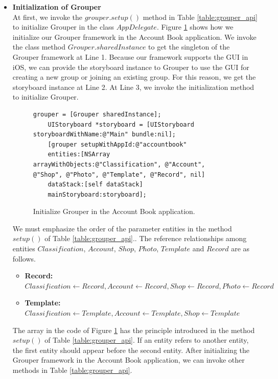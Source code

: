 \documentclass[a4paper,11pt]{report}
\begin{document}
\begin{itemize}
\setlength{\itemsep}{1pt}
\setlength{\parskip}{0pt}
\setlength{\parsep}{0pt}
\item \textbf{Initialization of Grouper} \\
At first, we invoke the $grouper.setup()$ method in Table \ref{table:grouper_api} to initialize Grouper in the class $AppDelegate$.
Figure \ref{fig:initialize_grouper} shows how we initialize our Grouper framework in the Account Book application.
We invoke the class method $Grouper.sharedInstance$ to get the singleton of the Grouper framework at Line 1.
Because our framework supports the GUI in iOS, we can provide the storyboard instance to Grouper to use the GUI for creating a new group or joining an existing group.
For this reason, we get the storyboard instance at Line 2.
At Line 3, we invoke the initialization method to initialize Grouper.

\begin{figure}
	\begin{lstlisting}[frame=none language=Objective-C] 
	grouper = [Grouper sharedInstance];
	UIStoryboard *storyboard = [UIStoryboard storyboardWithName:@"Main" bundle:nil];
	[grouper setupWithAppId:@"accountbook"
	entities:[NSArray arrayWithObjects:@"Classification", @"Account", @"Shop", @"Photo", @"Template", @"Record", nil]
	dataStack:[self dataStack]
	mainStoryboard:storyboard];
	\end{lstlisting}
	\caption{Initialize Grouper in the Account Book application.}
	\label{fig:initialize_grouper}
\end{figure}

We must emphasize the order of the parameter entities in the method $setup()$ of Table \ref{table:grouper_api}..
The reference relationships among entities $Classification$, $Account$, $Shop$, $Photo$, $Template$ and $Record$ are as follows.

\begin{itemize}
	\setlength{\itemsep}{1pt}
	\setlength{\parskip}{0pt}
	\setlength{\parsep}{0pt}
	\item \textbf{Record:}
	$Classification \gets Record, Account \gets Record, Shop \gets Record, Photo \gets Record$
	\item \textbf{Template:} 
	$Classification \gets Template, Account \gets Template, Shop \gets Template$
\end{itemize}

The array in the code of Figure \ref{fig:initialize_grouper} has the principle introduced in the method $setup()$ of Table \ref{table:grouper_api}.
If an entity refers to another entity, the first entity should appear before the second entity.
After initializing the Grouper framework in the Account Book application, we can invoke other methods in Table \ref{table:grouper_api}.
\\


\end{itemize}
\end{document}

